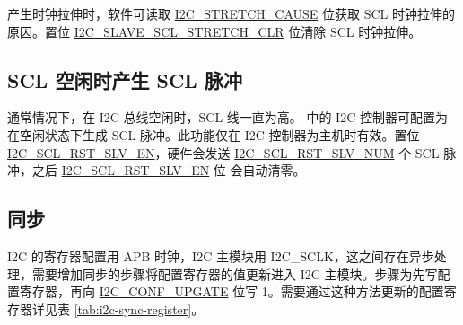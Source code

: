 \documentclass[main\_\_CN.tex]{subfiles}
\begin{document}
产生时钟拉伸时，软件可读取 \hyperref[fielddesc:I2CSTRETCHCAUSE]{I2C\_STRETCH\_CAUSE} 位获取 SCL 时钟拉伸的原因。置位 \hyperref[fielddesc:I2CSLAVESCLSTRETCHCLR]{I2C\_SLAVE\_SCL\_STRETCH\_CLR} 位清除 SCL 时钟拉伸。

\subsection{SCL 空闲时产生 SCL 脉冲}
通常情况下，在 I2C 总线空闲时，SCL 线一直为高。\chipname{} 中的 I2C 控制器可配置为在空闲状态下生成 SCL 脉冲。此功能仅在 I2C 控制器为主机时有效。置位 \hyperref[fielddesc:I2CSCLRSTSLVEN]{I2C\_SCL\_RST\_SLV\_EN}，硬件会发送 \hyperref[fielddesc:I2CSCLRSTSLVNUM]{I2C\_SCL\_RST\_SLV\_NUM} 个 SCL 脉冲，之后 \hyperref[fielddesc:I2CSCLRSTSLVEN]{I2C\_SCL\_RST\_SLV\_EN} 位
会自动清零。

\subsection{同步}
I2C 的寄存器配置用 APB 时钟，I2C 主模块用 I2C\_SCLK，这之间存在异步处理，需要增加同步的步骤将配置寄存器的值更新进入 I2C 主模块。步骤为先写配置寄存器，再向 \hyperref[fielddesc:I2CCONFUPGATE]{I2C\_CONF\_UPGATE} 位写 1。需要通过这种方法更新的配置寄存器详见表 \ref{tab:i2c-sync-register}。
\end{document}
